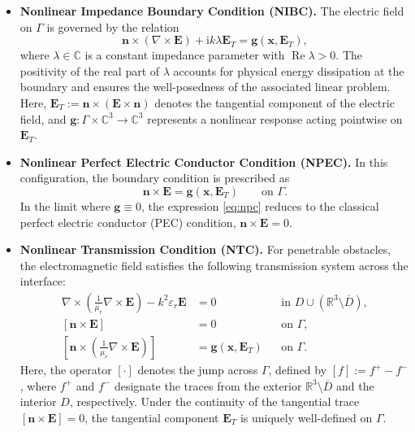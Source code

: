 \documentclass[12pt,reqno]{amsart}
\theoremstyle{definition}
\numberwithin{equation}{section}
\begin{document}
\begin{itemize}
    \item \textbf{Nonlinear Impedance Boundary Condition (NIBC).} 
    The electric field on $\Gamma$ is governed by the relation
    \begin{equation}\label{eq:NIBC}
        \mathbf{n} \times (\nabla \times \mathbf{E}) + \mathrm{i}k\lambda\mathbf{E}_T = \mathbf{g}(\boldsymbol{x}, \mathbf{E}_T),
    \end{equation}
    where $\lambda \in \mathbb{C}$ is a constant impedance parameter with $\operatorname{Re}\lambda > 0$. The positivity of the real part of $\lambda$ accounts for physical energy dissipation at the boundary and ensures the well-posedness of the associated linear problem. Here, $\mathbf{E}_T:= \mathbf{n} \times (\mathbf{E} \times \mathbf{n})$ denotes the tangential component of the electric field, and $\mathbf{g} \colon \Gamma \times \mathbb{C}^3 \to \mathbb{C}^3$ represents a nonlinear response acting pointwise on $\mathbf{E}_T$.

    \item \textbf{Nonlinear Perfect Electric Conductor Condition (NPEC).} 
    In this configuration, the boundary condition is prescribed as
    \begin{equation}\label{eq:npc}
        \mathbf{n} \times \mathbf{E} = \mathbf{g}(\boldsymbol{x}, \mathbf{E}_T) \qquad \text{on } \Gamma.
    \end{equation}
    In the limit where $\mathbf{g} \equiv 0$, the expression \eqref{eq:npc} reduces to the classical perfect electric conductor (PEC) condition, $\mathbf{n} \times \mathbf{E} = 0$.

    \item \textbf{Nonlinear Transmission Condition (NTC).} 
    For penetrable obstacles, the electromagnetic field satisfies the following transmission system across the interface:
    \begin{equation}\label{eq:transmission}
    \begin{aligned}
        \nabla \times \left( \frac{1}{\mu_r} \nabla \times \mathbf{E} \right) - k^2 \varepsilon_r \mathbf{E} &= 0 && \text{in } D \cup (\mathbb{R}^3 \setminus \overline{D}), \\
        [\mathbf{n} \times \mathbf{E}] &= 0 && \text{on } \Gamma, \\
        \left[ \mathbf{n} \times \left( \frac{1}{\mu_r} \nabla \times \mathbf{E} \right) \right] &= \mathbf{g}(\boldsymbol{x}, \mathbf{E}_T) && \text{on } \Gamma.
    \end{aligned}
    \end{equation}
    Here, the operator $[\cdot]$ denotes the jump across $\Gamma$, defined by $[f]:= f^+ - f^-$, where $f^+$ and $f^-$ designate the traces from the exterior $\mathbb{R}^3 \setminus \overline{D}$ and the interior $D$, respectively. Under the continuity of the tangential trace $[\mathbf{n} \times \mathbf{E}] = 0$, the tangential component $\mathbf{E}_T$ is uniquely well-defined on $\Gamma$.


\end{itemize}
\end{document}

